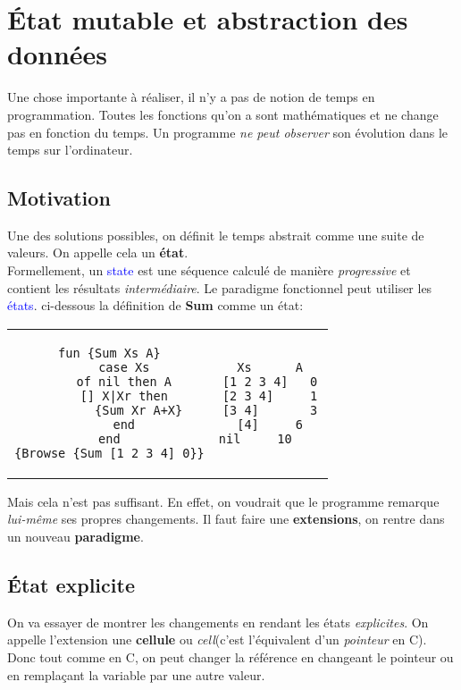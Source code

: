 \documentclass{report}
\begin{document}
\chapter{État mutable et abstraction des données}
Une chose importante à réaliser, il n'y a pas de notion de temps en programmation. Toutes les fonctions qu'on a sont mathématiques et ne change pas en fonction du temps. Un programme \textit{ ne peut observer} son évolution dans le temps sur l'ordinateur.

\section{Motivation}
Une des solutions possibles, on définit le temps abstrait comme une suite de valeurs. On appelle cela un \textbf{état}. \\
Formellement, un \textcolor{blue}{state} est une séquence calculé de manière \textit{progressive} et contient les résultats \textit{intermédiaire}. Le paradigme fonctionnel peut utiliser les \textcolor{blue}{états}. ci-dessous la définition de \textbf{Sum} comme un état:
\begin{center}
\begin{tabular}{c|c}
\begin{lstlisting}[escapechar=\%]
fun {Sum Xs A}
	case Xs
	of nil then A
	[] X|Xr then
		{Sum Xr A+X}
	end
end
{Browse {Sum [1 2 3 4] 0}}
\end{lstlisting}
& \begin{lstlisting}[escapechar=\%]
Xs		A
[1 2 3 4]	0
[2 3 4]		1
[3 4]		3
[4]		6
nil		10    
\end{lstlisting}
\end{tabular}
\end{center}
Mais cela n'est pas suffisant. En effet, on voudrait que le programme remarque \textit{lui-même} ses propres changements. Il faut faire une \textbf{extensions}, on rentre dans un nouveau \textbf{paradigme}.

\section{État explicite}
On va essayer de montrer les changements en rendant les états \textit{explicites}. On appelle l'extension une \textbf{cellule} ou \textit{cell}(c'est l'équivalent d'un \textit{pointeur} en C).\\
Donc tout comme en C, on peut changer la référence en changeant le pointeur ou en remplaçant la variable par une autre valeur.
\end{document}
